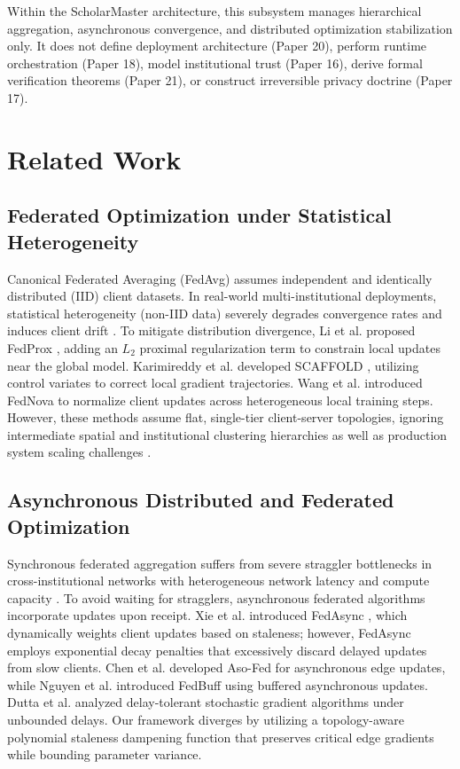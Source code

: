 \documentclass[conference]{IEEEtran}
\begin{document}
Within the ScholarMaster architecture, this subsystem manages hierarchical aggregation, asynchronous convergence, and distributed optimization stabilization only. It does not define deployment architecture (Paper 20), perform runtime orchestration (Paper 18), model institutional trust (Paper 16), derive formal verification theorems (Paper 21), or construct irreversible privacy doctrine (Paper 17).

\section{Related Work}

\subsection{Federated Optimization under Statistical Heterogeneity}
Canonical Federated Averaging (FedAvg) \cite{b1} assumes independent and identically distributed (IID) client datasets. In real-world multi-institutional deployments, statistical heterogeneity (non-IID data) severely degrades convergence rates and induces client drift \cite{b5, b7}. To mitigate distribution divergence, Li et al. proposed FedProx \cite{b15}, adding an $L_2$ proximal regularization term to constrain local updates near the global model. Karimireddy et al. developed SCAFFOLD \cite{b16}, utilizing control variates to correct local gradient trajectories. Wang et al. introduced FedNova \cite{b33} to normalize client updates across heterogeneous local training steps. However, these methods assume flat, single-tier client-server topologies, ignoring intermediate spatial and institutional clustering hierarchies as well as production system scaling challenges \cite{b8}.

\subsection{Asynchronous Distributed and Federated Optimization}
Synchronous federated aggregation suffers from severe straggler bottlenecks in cross-institutional networks with heterogeneous network latency and compute capacity \cite{b17, b26}. To avoid waiting for stragglers, asynchronous federated algorithms incorporate updates upon receipt. Xie et al. introduced FedAsync \cite{b4}, which dynamically weights client updates based on staleness; however, FedAsync employs exponential decay penalties that excessively discard delayed updates from slow clients. Chen et al. developed Aso-Fed \cite{b35} for asynchronous edge updates, while Nguyen et al. introduced FedBuff \cite{b36} using buffered asynchronous updates. Dutta et al. \cite{b37} analyzed delay-tolerant stochastic gradient algorithms under unbounded delays. Our framework diverges by utilizing a topology-aware polynomial staleness dampening function that preserves critical edge gradients while bounding parameter variance.
\end{document}
